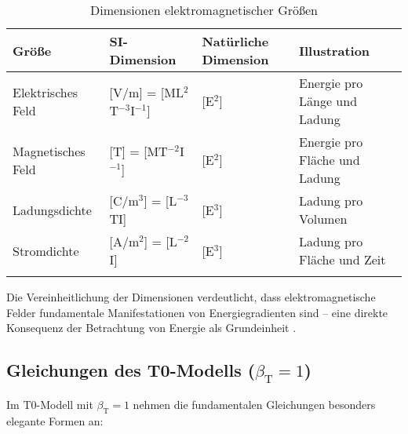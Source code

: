 \documentclass[12pt,a4paper]{article}
\newcommand{\betaT}{\beta_{\text{T}}}
\begin{document}
	\begin{table}[ht]
		\centering
		\begin{adjustbox}{scale=0.85}
			\begin{tabular}{llll}
				\hline
				\textbf{Größe} & \textbf{SI-Dimension} & \textbf{Natürliche Dimension} & \textbf{Illustration} \\
				\hline
				Elektrisches Feld & [V/m] = [ML$^2$T$^{-3}$I$^{-1}$] & [E$^2$] & Energie pro Länge und Ladung \\
				Magnetisches Feld & [T] = [MT$^{-2}$I$^{-1}$] & [E$^2$] & Energie pro Fläche und Ladung \\
				Ladungsdichte & [C/m$^3$] = [L$^{-3}$TI] & [E$^3$] & Ladung pro Volumen \\
				Stromdichte & [A/m$^2$] = [L$^{-2}$I] & [E$^3$] & Ladung pro Fläche und Zeit \\
				\hline
				\multicolumn{3}{c}{} \\
				\hline
			\end{tabular}
		\end{adjustbox}
		\caption{Dimensionen elektromagnetischer Größen}
		\label{tab:em_dimensions}
	\end{table}
	
	Die Vereinheitlichung der Dimensionen verdeutlicht, dass elektromagnetische Felder fundamentale Manifestationen von Energiegradienten sind – eine direkte Konsequenz der Betrachtung von Energie als Grundeinheit \cite{pascher_alpha_2025}.
	
	\subsection{Gleichungen des T0-Modells ($\betaT = 1$)}
	
	Im T0-Modell mit $\betaT = 1$ nehmen die fundamentalen Gleichungen besonders elegante Formen an:
	
\end{document}
